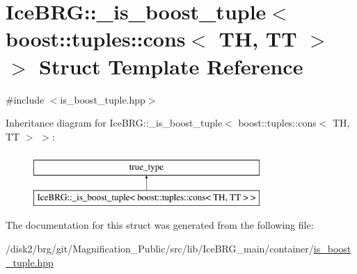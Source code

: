 \hypertarget{structIceBRG_1_1__is__boost__tuple_3_01boost_1_1tuples_1_1cons_3_01TH_00_01TT_01_4_01_4}{}\section{Ice\+B\+R\+G\+:\+:\+\_\+is\+\_\+boost\+\_\+tuple$<$ boost\+:\+:tuples\+:\+:cons$<$ T\+H, T\+T $>$ $>$ Struct Template Reference}
\label{structIceBRG_1_1__is__boost__tuple_3_01boost_1_1tuples_1_1cons_3_01TH_00_01TT_01_4_01_4}


{\ttfamily \#include $<$is\+\_\+boost\+\_\+tuple.\+hpp$>$}

Inheritance diagram for Ice\+B\+R\+G\+:\+:\+\_\+is\+\_\+boost\+\_\+tuple$<$ boost\+:\+:tuples\+:\+:cons$<$ T\+H, T\+T $>$ $>$\+:\begin{figure}[H]
\begin{center}
\leavevmode
\includegraphics[height=2.000000cm]{structIceBRG_1_1__is__boost__tuple_3_01boost_1_1tuples_1_1cons_3_01TH_00_01TT_01_4_01_4}
\end{center}
\end{figure}


The documentation for this struct was generated from the following file\+:\begin{DoxyCompactItemize}
\item 
/disk2/brg/git/\+Magnification\+\_\+\+Public/src/lib/\+Ice\+B\+R\+G\+\_\+main/container/\hyperlink{is__boost__tuple_8hpp}{is\+\_\+boost\+\_\+tuple.\+hpp}\end{DoxyCompactItemize}
